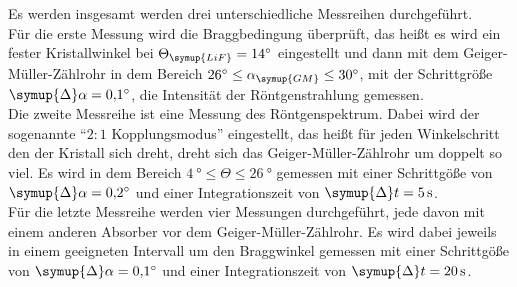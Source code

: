 Es werden insgesamt werden drei unterschiedliche Messreihen durchgeführt. \\
Für die erste Messung wird die Braggbedingung überprüft, das heißt es wird ein fester
Kristallwinkel bei $\Theta_\symup{LiF} = \SI{14}{\degree}$ eingestellt und dann mit dem
Geiger-Müller-Zählrohr in dem Bereich $ \SI{26}{\degree} \leq \alpha_\symup{GM} \leq
\SI{30}{\degree}$, mit der Schrittgröße $\symup{\Delta} \alpha = \SI{0.1}{\degree}$, die
Intensität der Röntgenstrahlung gemessen.\\
\newpage
Die zweite Messreihe ist eine Messung des Röntgenspektrum. Dabei wird der sogenannte
\enquote{$2 \colon \!\! 1$ Kopplungsmodus} eingestellt, das heißt für jeden Winkelschritt
den der Kristall sich dreht, dreht sich das Geiger-Müller-Zählrohr um doppelt so viel.
Es wird in dem Bereich $\SI{4}{\degree} \leq \Theta \leq \SI{26}{\degree}$ gemessen
mit einer Schrittgöße von $\symup{\Delta} \alpha = \SI{0.2}{\degree}$ und einer
Integrationszeit von $\symup{\Delta} t = \SI{5}{\second}$.\\
Für die letzte Messreihe werden vier Messungen durchgeführt, jede davon mit einem anderen
Absorber vor dem Geiger-Müller-Zählrohr. Es wird dabei jeweils in einem geeigneten
Intervall um den Braggwinkel gemessen mit einer Schrittgöße von $\symup{\Delta} \alpha
= \SI{0.1}{\degree}$ und einer Integrationszeit von $\symup{\Delta} t = \SI{20}{\second}$.
